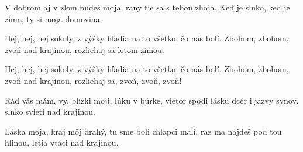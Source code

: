 \medskip

\begin{guitar}
  V dobrom aj v zlom budeš moja,
  rany tie sa s tebou zhoja.
  Keď je slnko, keď je zima,
  ty si moja domovina.
  
  \smallskip
  Hej, hej, hej sokoly,
  z výšky hľadia na to všetko, čo nás bolí.
  Zbohom, zbohom, zvoň nad krajinou,
  rozliehaj sa letom zimou.
  
  Hej, hej, hej sokoly,
  z výšky hľadia na to všetko, čo nás bolí.
  Zbohom, zbohom, zvoň nad krajinou,
  rozliehaj sa, zvoň, zvoň, zvoň!
  \smallskip
  
  Rád vás mám, vy, blízki moji,
  lúku v búrke, vietor spodí
  lásku dcér i jazvy synov,
  slnko svieti nad krajinou.
  
  
  
  Láska moja, kraj môj drahý,
  tu sme boli chlapci malí,
  raz ma nájdeš pod tou hlinou,
  letia vtáci nad krajinou.

\end{guitar}
